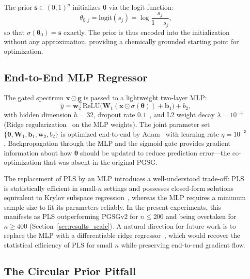 \documentclass[preprint,12pt,hidelinks]{elsarticle}
\begin{document}
The prior $\mathbf{s} \in (0,1)^p$ initializes $\boldsymbol{\theta}$ via
the logit function:
\begin{equation}
  \theta_{0,j} = \mathrm{logit}(s_j) = \log\frac{s_j}{1 - s_j},
  \label{eq:logit}
\end{equation}
so that $\sigma(\boldsymbol{\theta}_0) = \mathbf{s}$ exactly. The prior is
thus encoded into the initialization without any approximation, providing a
chemically grounded starting point for optimization.

\subsection{End-to-End MLP Regressor}

The gated spectrum $\mathbf{x} \odot \mathbf{g}$ is passed to a lightweight
two-layer MLP:
\begin{equation}
  \hat{y} = \mathbf{w}_2^\top
             \mathrm{ReLU}\!\bigl(
               \mathbf{W}_1 (\mathbf{x} \odot \sigma(\boldsymbol{\theta}))
               + \mathbf{b}_1
             \bigr) + b_2,
  \label{eq:pgsv2}
\end{equation}
with hidden dimension $h = 32$, dropout rate $0.1$~\cite{srivastava2014}, and L2 weight decay
$\lambda = 10^{-4}$ (Ridge regularization~\cite{hoerl1970} on the MLP weights). The joint
parameter set $\{\boldsymbol{\theta}, \mathbf{W}_1, \mathbf{b}_1,
\mathbf{w}_2, b_2\}$ is optimized end-to-end by Adam~\cite{kingma2015} with
learning rate $\eta = 10^{-3}$. Backpropagation through the MLP and the
sigmoid gate provides gradient information about how $\boldsymbol{\theta}$
should be updated to reduce prediction error---the co-optimization that was
absent in the original PGSG.

The replacement of PLS by an MLP introduces a well-understood
trade-off: PLS is statistically efficient in small-$n$ settings and
possesses closed-form solutions equivalent to Krylov subspace
regression~\cite{wold2001}, whereas the MLP requires a minimum sample size
to fit its parameters reliably. In the present experiments, this manifests
as PLS outperforming PGSGv2 for $n \leq 200$ and being overtaken for
$n \geq 400$ (Section~\ref{sec:results_scale}). A natural direction for
future work is to replace the MLP with a differentiable ridge
regressor~\cite{lorbert2011}, which would recover the statistical efficiency
of PLS for small $n$ while preserving end-to-end gradient flow.

\subsection{The Circular Prior Pitfall}
\label{sec:circular}
\end{document}
